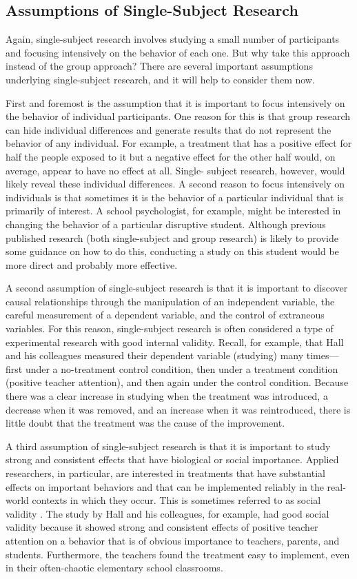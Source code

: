 \subsection{Assumptions of Single-Subject Research}

Again, single-subject research involves studying a small number of participants and focusing intensively on the behavior of each one. But why take this approach instead of the group approach? There are several important assumptions underlying single-subject research, and it will help to consider them now.

First and foremost is the assumption that it is important to focus intensively on the behavior of individual participants. One reason for this is that group research can hide individual differences and generate results that do not represent the behavior of any individual. For example, a treatment that has a positive effect for half the people exposed to it but a negative effect for the other half would, on average, appear to have no effect at all. Single- subject research, however, would likely reveal these individual differences. A second reason to focus intensively on individuals is that sometimes it is the behavior of a particular individual that is primarily of interest. A school psychologist, for example, might be interested in changing the behavior of a particular disruptive student. Although previous published research (both single-subject and group research) is likely to provide some guidance on how to do this, conducting a study on this student would be more direct and probably more effective.

A second assumption of single-subject research is that it is important to discover causal relationships through the manipulation of an independent variable, the careful measurement of a dependent variable, and the control of extraneous variables. For this reason, single-subject research is often considered a type of experimental research with good internal validity. Recall, for example, that Hall and his colleagues measured their dependent variable (studying) many times---first under a no-treatment control condition, then under a treatment condition (positive teacher attention), and then again under the control condition. Because there was a clear increase in studying when the treatment was introduced, a decrease when it was removed, and an increase when it was reintroduced, there is little doubt that the treatment was the cause of the improvement.

A third assumption of single-subject research is that it is important to study strong and consistent effects that have biological or social importance. Applied researchers, in particular, are interested in treatments that have substantial effects on important behaviors and that can be implemented reliably in the real-world contexts in which they occur. This is sometimes referred to as social validity \citep{wolf_social_1978}. The study by Hall and his colleagues, for example, had good social validity because it showed strong and consistent effects of positive teacher attention on a behavior that is of obvious importance to teachers, parents, and students. Furthermore, the teachers found the treatment easy to implement, even in their often-chaotic elementary school classrooms.

